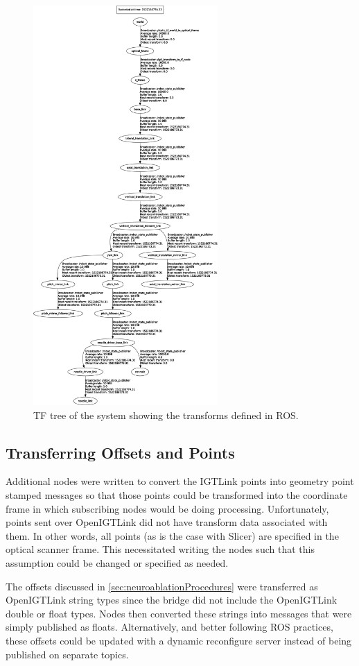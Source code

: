 \documentclass[12pt]{report}
\begin{document}
\begin{figure}[thpb]
	\centering
	\includegraphics[height=6in]{diagrams/neuro_tf_frames_clipped.pdf}
    \caption{TF tree of the system showing the transforms defined in ROS. }
    \label{fig:rosTFTree}
\end{figure}

\subsection{Transferring Offsets and Points}
Additional nodes were written to convert the IGTLink points into geometry point stamped messages so that those points could be transformed into the coordinate frame in which subscribing nodes would be doing processing. Unfortunately, points sent over OpenIGTLink did not have transform data associated with them. In other words, all points (as is the case with Slicer) are specified in the optical scanner frame. This necessitated writing the nodes such that this assumption could be changed or specified as needed.

The offsets discussed in \autoref{sec:neuroablationProcedures} were transferred as OpenIGTLink string types since the bridge did not include the OpenIGTLink double or float types. Nodes then converted these strings into messages that were simply published as floats. Alternatively, and better following ROS practices, these offsets could be updated with a dynamic reconfigure server instead of being published on separate topics.
\end{document}
